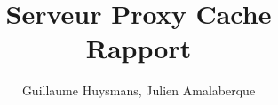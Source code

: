 \documentclass{article}
\begin{document}
\author{Guillaume Huysmans, Julien Amalaberque}
\title{Serveur Proxy Cache\\
Rapport\\}
\maketitle




\end{document}
